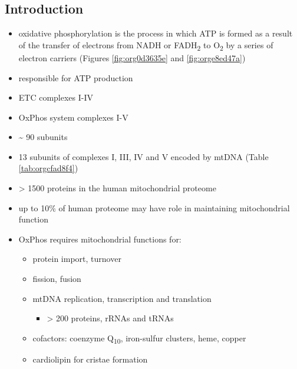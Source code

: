 \documentclass[12pt]{scrartcl}
\begin{document}
\subsection{Introduction}
\label{sec:orgd5efb26}
\begin{itemize}
\item oxidative phosphorylation is the process in which ATP is formed as a
result of the transfer of electrons from NADH or FADH\textsubscript{2} to O\textsubscript{2} by a
series of electron carriers (Figures \ref{fig:org0d3635e} and \ref{fig:orge8ed47a})
\item responsible for ATP production
\item ETC complexes I-IV
\item OxPhos system complexes I-V
\item \textasciitilde{} 90 subunits
\item 13 subunits of complexes I, III, IV and V encoded by mtDNA (Table \ref{tab:orgcfad8f4})
\item \textgreater{} 1500 proteins in the human mitochondrial proteome
\item up to 10\% of human proteome may have role in maintaining mitochondrial function
\item OxPhos requires mitochondrial functions for:
\begin{itemize}
\item protein import, turnover
\item fission, fusion
\item mtDNA replication, transcription and translation
\begin{itemize}
\item \textgreater{} 200 proteins, rRNAs and tRNAs
\end{itemize}
\item cofactors: coenzyme Q\textsubscript{10}, iron-sulfur clusters, heme, copper
\item cardiolipin for cristae formation
\end{itemize}


\end{itemize}
\end{document}
